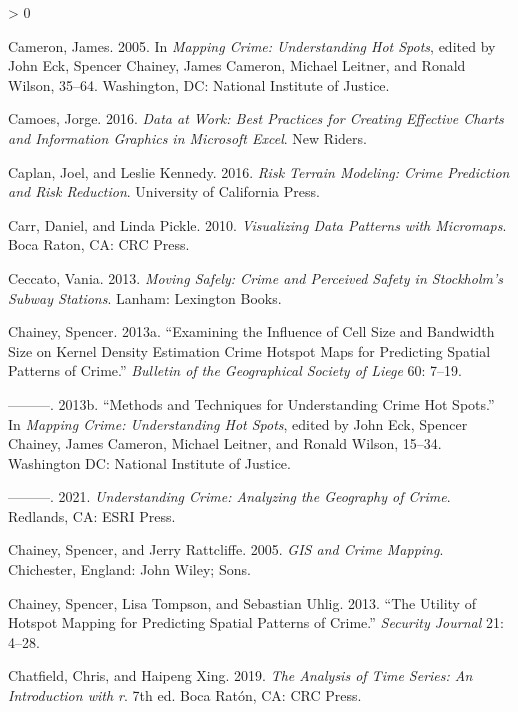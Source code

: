 \documentclass[
  krantz2]{krantz}
\newlength{\cslhangindent}
\newenvironment{CSLReferences}[2] %
 {%
  \setlength{\parindent}{0pt}
  \ifodd #1 \everypar{\setlength{\hangindent}{\cslhangindent}}\ignorespaces\fi
  \ifnum #2 > 0
  \setlength{\parskip}{#2\baselineskip}
  \fi
 }%
 {}
\begin{document}
\begin{CSLReferences}{1}{0}
\leavevmode\hypertarget{ref-Cameron_2005}{}%
Cameron, James. 2005. In \emph{Mapping Crime: Understanding Hot Spots}, edited by John Eck, Spencer Chainey, James Cameron, Michael Leitner, and Ronald Wilson, 35--64. Washington, DC: National Institute of Justice.

\leavevmode\hypertarget{ref-Camoes_2016}{}%
Camoes, Jorge. 2016. \emph{Data at Work: Best Practices for Creating Effective Charts and Information Graphics in Microsoft Excel}. New Riders.

\leavevmode\hypertarget{ref-Caplan_2016}{}%
Caplan, Joel, and Leslie Kennedy. 2016. \emph{Risk Terrain Modeling: Crime Prediction and Risk Reduction}. University of California Press.

\leavevmode\hypertarget{ref-Carr_2010}{}%
Carr, Daniel, and Linda Pickle. 2010. \emph{Visualizing Data Patterns with Micromaps}. Boca Raton, CA: CRC Press.

\leavevmode\hypertarget{ref-Ceccato_2013}{}%
Ceccato, Vania. 2013. \emph{Moving Safely: Crime and Perceived Safety in Stockholm's Subway Stations}. Lanham: Lexington Books.

\leavevmode\hypertarget{ref-Chainey_2013a}{}%
Chainey, Spencer. 2013a. {``Examining the Influence of Cell Size and Bandwidth Size on Kernel Density Estimation Crime Hotspot Maps for Predicting Spatial Patterns of Crime.''} \emph{Bulletin of the Geographical Society of Liege} 60: 7--19.

\leavevmode\hypertarget{ref-Chainey_2013b}{}%
---------. 2013b. {``Methods and Techniques for Understanding Crime Hot Spots.''} In \emph{Mapping Crime: Understanding Hot Spots}, edited by John Eck, Spencer Chainey, James Cameron, Michael Leitner, and Ronald Wilson, 15--34. Washington DC: National Institute of Justice.

\leavevmode\hypertarget{ref-Chainey_2021}{}%
---------. 2021. \emph{Understanding Crime: Analyzing the Geography of Crime}. Redlands, CA: ESRI Press.

\leavevmode\hypertarget{ref-Chainey_2005}{}%
Chainey, Spencer, and Jerry Rattcliffe. 2005. \emph{GIS and Crime Mapping}. Chichester, England: John Wiley; Sons.

\leavevmode\hypertarget{ref-Chainey_2008}{}%
Chainey, Spencer, Lisa Tompson, and Sebastian Uhlig. 2013. {``The Utility of Hotspot Mapping for Predicting Spatial Patterns of Crime.''} \emph{Security Journal} 21: 4--28.

\leavevmode\hypertarget{ref-Chatfield_2019}{}%
Chatfield, Chris, and Haipeng Xing. 2019. \emph{The Analysis of Time Series: An Introduction with r}. 7th ed. Boca Ratón, CA: CRC Press.


\end{CSLReferences}
\end{document}
